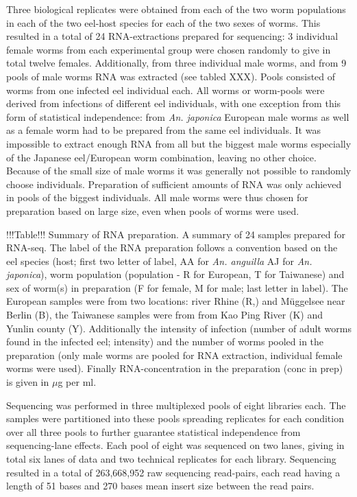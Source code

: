 \documentclass[10pt]{article}
\begin{document}
Three biological replicates were obtained from each of the two worm
populations in each of the two eel-host species for each of the two
sexes of worms. This resulted in a total of 24 RNA-extractions
prepared for sequencing: 3 individual female worms from each
experimental group were chosen randomly to give in total twelve
females. Additionally, from three individual male worms, and from 9
pools of male worms RNA was extracted (see tabled XXX). Pools
consisted of worms from one infected eel individual each. All worms or
worm-pools were derived from infections of different eel individuals,
with one exception from this form of statistical independence: from
\textit{An. japonica} European male worms as well as a female worm had
to be prepared from the same eel individuals. It was impossible to
extract enough RNA from all but the biggest male worms especially of
the Japanese eel/European worm combination, leaving no other
choice. Because of the small size of male worms it was generally not
possible to randomly choose individuals. Preparation of sufficient
amounts of RNA was only achieved in pools of the biggest
individuals. All male worms were thus chosen for preparation based on
large size, even when pools of worms were used.


!!!Table!!! Summary of RNA preparation. A summary of 24 samples
prepared for RNA-seq. The label of the RNA preparation follows a
convention based on the eel species (host; first two letter of label,
AA for \textit{An. anguilla} AJ for \textit{An. japonica}), worm
population (population - R for European, T for Taiwanese) and sex of
worm(s) in preparation (F for female, M for male; last letter in
label). The European samples were from two locations: river Rhine (R,)
and M\"uggelsee near Berlin (B), the Taiwanese samples were from from
Kao Ping River (K) and Yunlin county (Y). Additionally the intensity
of infection (number of adult worms found in the infected eel;
intensity) and the number of worms pooled in the preparation (only
male worms are pooled for RNA extraction, individual female worms were
used). Finally RNA-concentration in the preparation (conc in prep) is
given in $\mu$g per ml.

Sequencing was performed in three multiplexed pools of eight libraries
each. The samples were partitioned into these pools spreading
replicates for each condition over all three pools to further
guarantee statistical independence from sequencing-lane effects. Each
pool of eight was sequenced on two lanes, giving in total six lanes of
data and two technical replicates for each library. Sequencing
resulted in a total of 263,668,952 raw sequencing read-pairs, each
read having a length of 51 bases and 270 bases mean insert size
between the read pairs.
\end{document}
